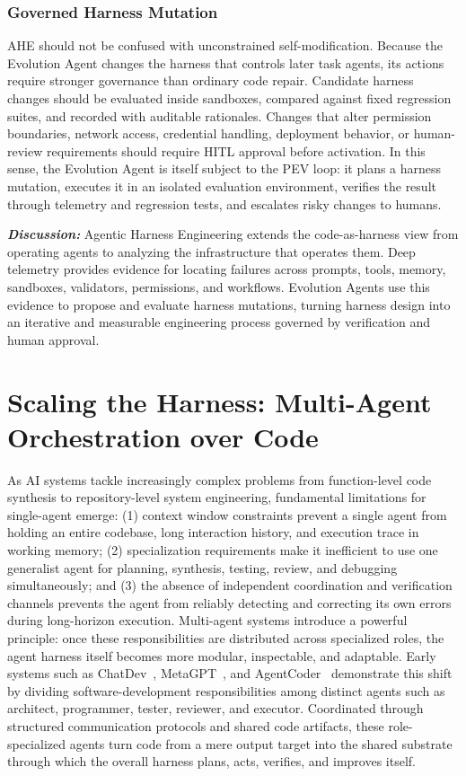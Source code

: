 \documentclass{llmxive}
\begin{document}
\subsubsection{Governed Harness Mutation}
AHE should not be confused with unconstrained self-modification. Because the Evolution Agent changes the harness that controls later task agents, its actions require stronger governance than ordinary code repair. Candidate harness changes should be evaluated inside sandboxes, compared against fixed regression suites, and recorded with auditable rationales. Changes that alter permission boundaries, network access, credential handling, deployment behavior, or human-review requirements should require HITL approval before activation. In this sense, the Evolution Agent is itself subject to the PEV loop: it plans a harness mutation, executes it in an isolated evaluation environment, verifies the result through telemetry and regression tests, and escalates risky changes to humans.

\textbf{\textit{Discussion:}} Agentic Harness Engineering extends the code-as-harness view from operating agents to analyzing the infrastructure that operates them. Deep telemetry provides evidence for locating failures across prompts, tools, memory, sandboxes, validators, permissions, and workflows. Evolution Agents use this evidence to propose and evaluate harness mutations, turning harness design into an iterative and measurable engineering process governed by verification and human approval.


\section{Scaling the Harness: Multi-Agent Orchestration over Code}
\label{sec:mas}

As AI systems tackle increasingly complex problems from
function-level code synthesis to repository-level system
engineering, fundamental limitations for single-agent emerge: (1)
context window constraints prevent a single agent from holding an
entire codebase, long interaction history, and execution trace in
working memory; (2) specialization requirements make it
inefficient to use one generalist agent for planning, synthesis,
testing, review, and debugging simultaneously; and (3) the
absence of independent coordination and verification channels
prevents the agent from reliably detecting and correcting its own
errors during long-horizon execution.
Multi-agent systems introduce a powerful principle: once these
responsibilities are distributed across specialized roles, the
agent harness itself becomes more modular, inspectable, and
adaptable.
Early systems such as ChatDev~\cite{Qian2023ChatDev},
MetaGPT~\cite{Hong2023MetaGPT}, and AgentCoder~\cite{huang2023agentcoder}
demonstrate this shift by dividing software-development
responsibilities among distinct agents such as architect,
programmer, tester, reviewer, and executor.
Coordinated through structured communication protocols and shared
code artifacts, these role-specialized agents turn code from a
mere output target into the shared substrate through which the
overall harness plans, acts, verifies, and improves itself.
\end{document}
